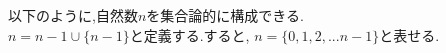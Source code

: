 \begin{definition}[p16]
	\label{definition:集合論的な自然数の定義}
	以下のように,自然数$n$を集合論的に構成できる.\\
	$n = n - 1 \cup \{n - 1\}$と定義する.すると,
	$n = \{0,1,2,... n-1\}と表せる.$
\end{definition}
